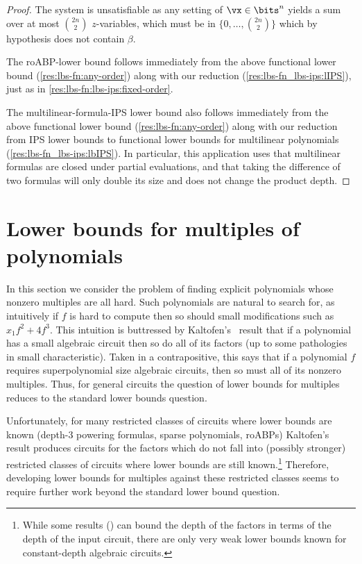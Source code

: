 \documentclass[11pt]{article}
\numberwithin{equation}{section}
\theoremstyle{definition}
\theoremstyle{plain}
\begin{document}
\begin{proof}
        The system is unsatisfiable as any setting of $\vx\in\bits^n$ yields a sum over at most $\binom{2n}{2}$ $z$-variables, which must be in $\{0,\ldots,\binom{2n}{2}\}$ which by hypothesis does not contain $\beta$.

        The roABP-\lIPS lower bound follows immediately from the above functional lower bound (\autoref{res:lbs-fn:any-order}) along with our reduction (\autoref{res:lbs-fn_lbs-ips:lIPS}), just as in \autoref{res:lbs-fn:lbs-ips:fixed-order}.

        The multilinear-formula-IPS lower bound also follows immediately from the above functional lower bound (\autoref{res:lbs-fn:any-order}) along with our reduction from IPS lower bounds to functional lower bounds for multilinear polynomials (\autoref{res:lbs-fn_lbs-ips:lbIPS}).  In particular, this application uses that multilinear formulas are closed under partial evaluations, and that taking the difference of two formulas will only double its size and does not change the product depth.
\end{proof}


\section{Lower bounds for multiples of polynomials}\label{sec:lbs-mult}

In this section we consider the problem of finding explicit polynomials whose nonzero multiples are all hard. Such polynomials are natural to search for, as intuitively if $f$ is hard to compute then so should small modifications such as $x_1f^2+4f^3$. This intuition is buttressed by Kaltofen's~\cite{Kaltofen89} result that if a polynomial has a small algebraic circuit then so do all of its factors (up to some pathologies in small characteristic). Taken in a contrapositive, this says that if a polynomial $f$ requires superpolynomial size algebraic circuits, then so must all of its nonzero multiples.  Thus, for general circuits the question of lower bounds for multiples reduces to the standard lower bounds question. %

Unfortunately, for many restricted classes of circuits where lower bounds are known (depth-3 powering formulas, sparse polynomials, roABPs) Kaltofen's~\cite{Kaltofen89} result produces circuits for the factors which do not fall into (possibly stronger) restricted classes of circuits where lower bounds are still known.\footnote{While some results (\cite{DvirSY09,Oliveira15}) can bound the depth of the factors in terms of the depth of the input circuit, there are only very weak lower bounds known for constant-depth algebraic circuits.}
Therefore, %
developing lower bounds for multiples against these restricted classes seems to require further work beyond the standard lower bound question.
\end{document}

